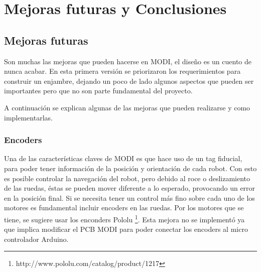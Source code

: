 
\chapter{Mejoras futuras y Conclusiones} %

\label{ChapterX} %



\section{Mejoras futuras}

Son muchas las mejoras que pueden hacerse en MODI, el diseño es un cuento de nunca acabar. En esta primera versión se priorizaron los requerimientos para construir un enjambre, dejando un poco de lado algunos aspectos que pueden ser importantes pero que no son parte fundamental del proyecto.

A continuación se explican algunas de las mejoras que pueden realizarse y como implementarlas.


\subsection{Encoders}
Una de las características claves de MODI es que hace uso de un tag fiducial, para poder tener información de la posición y orientación de cada robot. Con esto es posible controlar la navegación del robot, pero debido al roce o deslizamiento de las ruedas, éstas se pueden mover diferente a lo esperado, provocando un error en la posición final. Si se necesita tener un control más fino sobre cada uno de los motores es fundamental incluir encoders en las ruedas. Por los motores que se tiene, se sugiere usar los enconders Pololu \footnote{http://www.pololu.com/catalog/product/1217}. Esta mejora no se implementó ya que implica modificar el PCB MODI para poder conectar los encoders al micro controlador Arduino.

